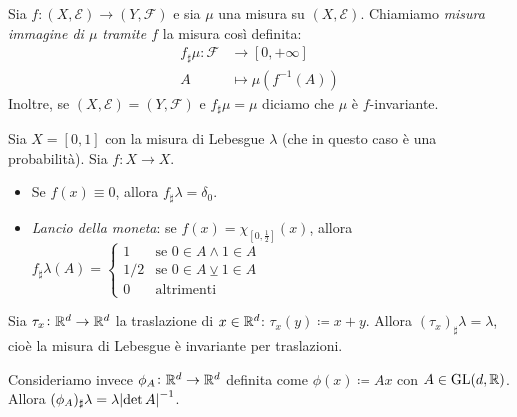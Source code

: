 \begin{definition}
	Sia $ f\colon (X,\mathcal{E}) \to (Y,\mathcal{F}) $ e sia $ \mu $ una misura su $ (X,\mathcal{E}) $. Chiamiamo \emph{misura immagine di $ \mu $ tramite $ f $} la misura così definita:
	\begin{align*}
		f_\sharp \mu\colon \mathcal{F} & \to [0,+\infty]                      \\
		A                              & \mapsto \mu \left( f^{-1}(A) \right)
	\end{align*}
	Inoltre, se $ (X,\mathcal{E}) = (Y,\mathcal{F}) $ e $ f_\sharp\mu = \mu $ diciamo che $ \mu $ è $ f $-invariante.
\end{definition}
\begin{example}
	Sia $ X = [0,1] $ con la misura di Lebesgue $ \lambda $ (che in questo caso è una probabilità). Sia $ f\colon X\to X $.
	\begin{itemize}
		\item Se $ f(x) \equiv 0 $, allora $ f_\sharp \lambda = \delta_0 $.
		\item \emph{Lancio della moneta}: se $ f(x) = \chi_{[0,\frac{1}{2}]}(x) $, allora $ f_\sharp \lambda (A) =
		\begin{cases}
			1	& \text{se } 0\in A \wedge 1 \in A \\
			1/2 & \text{se } 0\in A \veebar 1\in A \\
			0			& \text{altrimenti}
		\end{cases} $
	\end{itemize}
\end{example}
\begin{example}
	Sia $ \tau_x\colon \mathbb{R}^d\to\mathbb{R}^d $ la traslazione di $ x\in\mathbb{R}^d $: $ \tau_x(y) \coloneqq x+y $.
	Allora $ (\tau_x)_\sharp\lambda = \lambda $, cioè la misura di Lebesgue è invariante per traslazioni.

	Consideriamo invece $ \phi_A\colon\mathbb{R}^d\to\mathbb{R}^d $ definita come $ \phi(x) \coloneqq Ax $ con $ A \in\mathrm{GL}(d,\mathbb{R}) $. Allora $ (\phi_A)_\sharp\lambda = \lambda\abs{\det A}^{-1} $.
\end{example}
